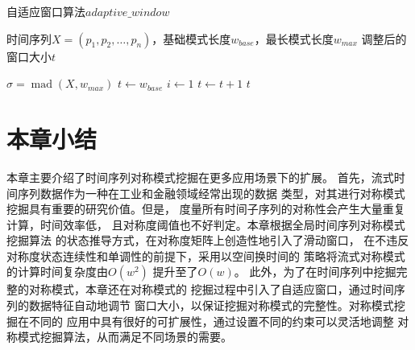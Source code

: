 \renewcommand{\algorithmicrequire}{\textbf{输入：}\unskip}
\renewcommand{\algorithmicensure}{\textbf{输出：}\unskip}

\begin{algorithm}[h]
  \caption{自适应窗口算法$adaptive\_window$}
  \label{alg:adaptive_window}
  \small
  \begin{algorithmic}
    \REQUIRE 时间序列$X=\left(p_1,p_2,…,p_n\right)$，基础模式长度$w_{base}$，最长模式长度$w_{max}$
    \ENSURE 调整后的窗口大小$t$

    \STATE $\sigma=\operatorname{mad}(X, w_{max})$
    \STATE $t \leftarrow w_{base}$
    \STATE $i \leftarrow 1$
      \STATE $t \leftarrow t+1$
    \ENDWHILE
    \RETURN $t$
  \end{algorithmic}
\end{algorithm}

\section{本章小结}
本章主要介绍了时间序列对称模式挖掘在更多应用场景下的扩展。
首先，流式时间序列数据作为一种在工业和金融领域经常出现的数据
类型，对其进行对称模式挖掘具有重要的研究价值。但是，
度量所有时间子序列的对称性会产生大量重复计算，时间效率低，
且对称度阈值也不好判定。本章根据全局时间序列对称模式挖掘算法
的状态推导方式，在对称度矩阵上创造性地引入了滑动窗口，
在不违反对称度状态连续性和单调性的前提下，采用以空间换时间的
策略将流式对称模式的计算时间复杂度由$O\left(w^2\right)$
提升至了$O\left(w\right)$。
此外，为了在时间序列中挖掘完整的对称模式，本章还在对称模式的
挖掘过程中引入了自适应窗口，通过时间序列的数据特征自动地调节
窗口大小，以保证挖掘对称模式的完整性。对称模式挖掘在不同的
应用中具有很好的可扩展性，通过设置不同的约束可以灵活地调整
对称模式挖掘算法，从而满足不同场景的需要。







